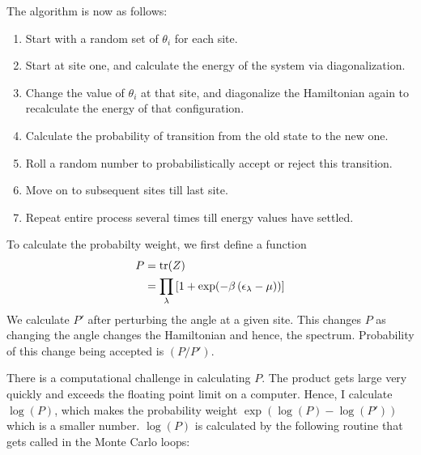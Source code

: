 \documentclass[]{article}
\begin{document}
The algorithm is now as follows:
	\begin{enumerate}
	\item Start with a random set of $ \theta_i $ for each site.
	\item Start at site one, and calculate the energy of the system via diagonalization.
	\item Change the value of $ \theta_i $ at that site, and diagonalize the Hamiltonian again to recalculate the energy of that configuration.
	\item Calculate the probability of transition from the old state to the new one.
	\item Roll a random number to probabilistically accept or reject this transition.
	\item Move on to subsequent sites till last site.
	\item Repeat entire process several times till energy values have settled.
\end{enumerate}

To calculate the probabilty weight, we first define a function
\begin{align}
\nonumber
P &= \tr(Z)\\
&= \prod\limits_{\lambda}\left[1 + \exp(-\beta \left( \epsilon_\lambda - \mu \right))\right]
\end{align}
We calculate $ P' $ after perturbing the angle at a given site. This changes $ P $ as changing the angle changes the Hamiltonian and hence, the spectrum. Probability of this change being accepted is $ (P/P') $.

There is a computational challenge in calculating $ P $. The product gets large very quickly and exceeds the floating point limit on a computer. Hence, I calculate $ \log(P) $, which makes the probability weight $ \exp(\log(P)-\log(P')) $ which is a smaller number. $ \log(P) $ is calculated by the following routine that gets called in the Monte Carlo loops:
\end{document}
